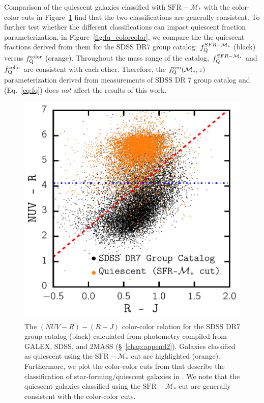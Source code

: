 Comparison of the quiescent galaxies classified with $\mathrm{SFR} - \mathcal{M}_*$ 
with the color-color cuts in Figure~\ref{fig:NUV_R_J} find that
the two classifications are generally consistent. To further 
test whether the different classifications can impact quiescent
fraction parameterization, in Figure~\ref{fig:fq_colorcolor}, we 
compare the the quiescent fractions derived from them for the 
SDSS DR7 group catalog: $f_\mathrm{Q}^{SFR-\mathcal{M}_*}$ (black) versus 
$f_\mathrm{Q}^{\rm color}$ (orange). Throughout the mass range of the 
catalog, $f_\mathrm{Q}^{SFR-\mathcal{M}_*}$ and $f_\mathrm{Q}^{\rm color}$ are 
consistent with each other. Therefore, the $f_\mathrm{Q}^\mathrm{cen}(\mathcal{M}_*, z)$ 
parameterization derived from measurements of SDSS DR 7 group catalog 
and \cite{Tinker:2013aa} (Eq.~\ref{eq:fq}) does {\em not} affect the 
results of this work.

\begin{figure}
\begin{center}
\includegraphics[width=\textwidth]{figs/cenq/nuv_r_j.pdf}
\caption{
The $(NUV - R) - (R - J)$ color-color relation for the
SDSS DR7 group catalog (black) calculated from photometry 
compiled from GALEX, SDSS, and 2MASS (\S~\ref{chap:append2}). 
Galaxies classified as quiescent using the $\mathrm{SFR} - \mathcal{M}_*$ 
cut are highlighted (orange). Furthermore, we plot the color-color 
cuts from \cite{Bundy:2010aa} that describe the classification
of star-forming/quiescent galaxies in \cite{Tinker:2013aa}. 
We note that the quiescent galaxies classified using the 
$\mathrm{SFR} - \mathcal{M}_*$ cut are generally consistent with 
the \cite{Bundy:2010aa} color-color cuts. 
}
\label{fig:NUV_R_J}
\end{center}
\end{figure}

